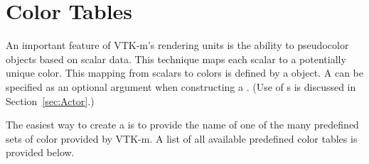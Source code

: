 \section{Color Tables}
\label{sec:ColorTables}


An important feature of VTK-m's rendering units is the ability to
pseudocolor objects based on scalar data. This technique maps each scalar
to a potentially unique color. This mapping from scalars to colors is
defined by a  object. A
 can be specified as an optional argument when
constructing a . (Use of s is
discussed in Section~\ref{sec:Actor}.)


The easiest way to create a  is to provide the
name of one of the many predefined sets of color provided by VTK-m. A list
of all available predefined color tables is provided below.

\newlength{\fontdrop}		%
\settodepth{\fontdrop}{()}	%
\newcommand*{\includecolortable}[1]{%
  \raisebox{-\fontdrop}{\texttt{[image: images/ColorTables/\#1]}}%
}
\newcommand*{\ctcolumns}[1]{%
  \includecolortable{#1} & #1 & %
}

